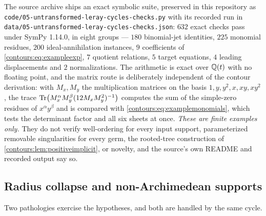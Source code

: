 \documentclass[11pt,letterpaper]{article}
\theoremstyle{definition}
\theoremstyle{remark}
\numberwithin{equation}{section}
\begin{document}
\begin{remark}
\label{contours:rem:leraychecks}
The source archive ships an exact symbolic suite, preserved in this repository
as \texttt{code/05-untransformed-leray-cycles-checks.py} with its recorded run
in \texttt{data/05-untransformed-leray-cycles-checks.json}: $632$ exact checks
pass under SymPy 1.14.0, in eight groups --- $180$ binomial-jet identities,
$225$ monomial residues, $200$ ideal-annihilation instances, $9$ coefficients of
\eqref{contours:eq:exampleexp}, $7$ quotient relations, $5$ target equations, $4$
leading displacements and $2$ normalizations. The arithmetic is exact over
$\mathbb Q(t)$ with no floating point, and the matrix route is deliberately independent
of the contour derivation: with $M_x,M_y$ the multiplication matrices on the
basis $1,y,y^2,x,xy,xy^2$, the trace
$\operatorname{Tr}\bigl(M_x^\alpha M_y^\beta(12M_xM_y^2)^{-1}\bigr)$ computes the sum of the
simple-zero residues of $x^\alpha y^\beta$ and is compared with
\eqref{contours:eq:examplemonomials}, which tests the determinant factor and all
six sheets at once. \emph{These are finite examples only.} They do not verify
well-ordering for every input support, parameterized removable singularities for
every germ, the rooted-tree construction of
\cref{contours:lem:positiveimplicit}, or novelty, and the source's own README and
recorded output say so.
\end{remark}

\subsection{Radius collapse and non-Archimedean supports}
\label{contours:subsec:pathologies}
Two pathologies exercise the hypotheses, and both are handled by the same cycle.
\end{document}
